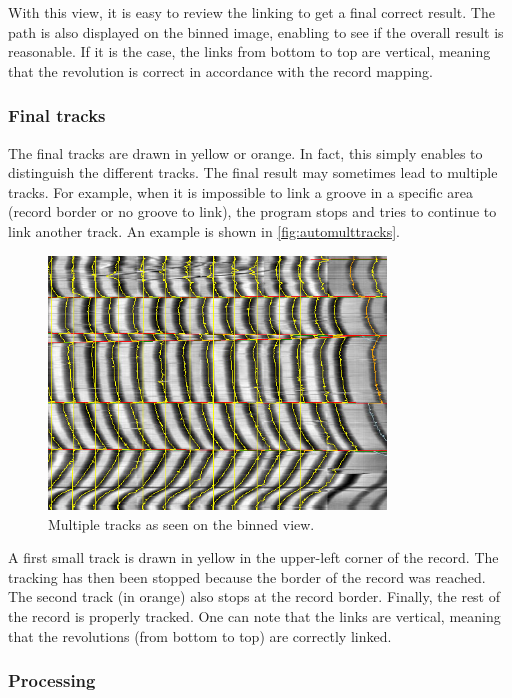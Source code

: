 With this view, it is easy to review the linking to get a final correct result. The path is also displayed on the binned image, enabling to see if the overall result is reasonable. If it is the case, the links from bottom to top are vertical, meaning that the revolution is correct in accordance with the record mapping.

\subsubsection{Final tracks}

The final tracks are drawn in yellow or orange. In fact, this simply enables to distinguish the different tracks. The final result may sometimes lead to multiple tracks. For example, when it is impossible to link a groove in a specific area (record border or no groove to link), the program stops and tries to continue to link another track. An example is shown in \autoref{fig:automulttracks}.

\begin{figure}[!ht]
\centering
\includegraphics[width=0.8\textwidth]{images/auto-multiple-tracks}
\caption{Multiple tracks as seen on the binned view.}
\label{fig:automulttracks}
\end{figure}

A first small track is drawn in yellow in the upper-left corner of the record. The tracking has then been stopped because the border of the record was reached. The second track (in orange) also stops at the record border. Finally, the rest of the record is properly tracked. One can note that the links are vertical, meaning that the revolutions (from bottom to top) are correctly linked.

\subsubsection{Processing}

